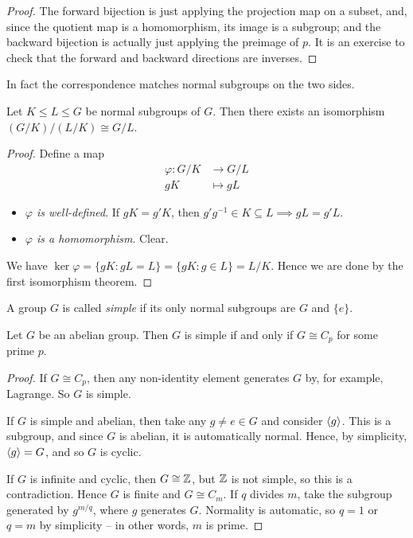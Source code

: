 \documentclass{../../template/note}
\begin{document}
    \begin{proof}
        The forward bijection is just applying the projection map on a subset, and, since the quotient map is a homomorphism, its image is a subgroup; and the backward bijection is actually just applying the preimage of $p$. It is an exercise to check that the forward and backward directions are inverses.
    \end{proof}

    \begin{remark*}
        In fact the correspondence matches normal subgroups on the two sides.
    \end{remark*}
    
    \begin{theorem}
        Let $K \leq L \leq G$ be normal subgroups of $G$. Then there exists an isomorphism $(G/K)/(L/K) \cong G/L$.
    \end{theorem}
    
    \begin{proof}
        Define a map
        \begin{align*}
            \varphi: G/K &\to G/L \\
            gK &\mapsto gL
        \end{align*}
        \begin{itemize}
            \item \emph{$\varphi$ is well-defined}. If $gK = g'K$, then $g'g^{-1} \in K \subseteq L \implies gL = g'L$.
            \item \emph{$\varphi$ is a homomorphism}. Clear.
        \end{itemize}
        We have $\ker \varphi = \{gK: gL = L\} = \{gK: g \in L\} = L/K$. Hence we are done by the first isomorphism theorem.
    \end{proof}
    
    \begin{definition}[Simplicity]
        A group $G$ is called \emph{simple} if its only normal subgroups are $G$ and $\{e\}$.
    \end{definition}
    
    \begin{proposition}
        Let $G$ be an abelian group. Then $G$ is simple if and only if $G \cong C_p$ for some prime $p$.
    \end{proposition}
    
    \begin{proof}
        If $G \cong C_p$, then any non-identity element generates $G$ by, for example, Lagrange. So $G$ is simple.

        If $G$ is simple and abelian, then take any $g \neq e \in G$ and consider $\left \langle g \right \rangle$. This is a subgroup, and since $G$ is abelian, it is automatically normal. Hence, by simplicity, $\left \langle g \right \rangle = G$, and so $G$ is cyclic.

        If $G$ is infinite and cyclic, then $G \cong \mathbb Z$, but $\mathbb Z$ is not simple, so this is a contradiction. Hence $G$ is finite and $G \cong C_m$. If $q$ divides $m$, take the subgroup generated by $g^{m/q}$, where $g$ generates $G$. Normality is automatic, so $q=1$ or $q=m$ by simplicity -- in other words, $m$ is prime.
    \end{proof}
    
\end{document}
